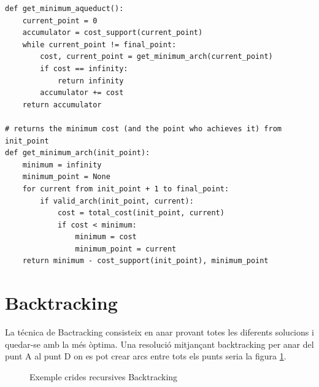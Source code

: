 \documentclass[12pt, letterpaper]{article}
\begin{document}
\begin{verbatim}
def get_minimum_aqueduct():
    current_point = 0
    accumulator = cost_support(current_point)
    while current_point != final_point:
        cost, current_point = get_minimum_arch(current_point)
        if cost == infinity:
            return infinity
        accumulator += cost
    return accumulator

# returns the minimum cost (and the point who achieves it) from init_point
def get_minimum_arch(init_point):
    minimum = infinity 
    minimum_point = None
    for current from init_point + 1 to final_point:
        if valid_arch(init_point, current):
            cost = total_cost(init_point, current)
            if cost < minimum:
                minimum = cost
                minimum_point = current
    return minimum - cost_support(init_point), minimum_point

\end{verbatim}

\newpage
    
\section{Backtracking}
La técnica de Bactracking consisteix en anar provant totes les diferents solucions i quedar-se amb la més òptima. Una
resolució mitjançant backtracking per anar del punt A al punt D on es pot crear arcs entre tots els punts seria la figura \ref{exemple:backtracking}.

\begin{figure}[htbp]
\begin{center}
\caption{Exemple crides recursives Backtracking}
\label{exemple:backtracking}
\end{center}
\end{figure}
\end{document}
